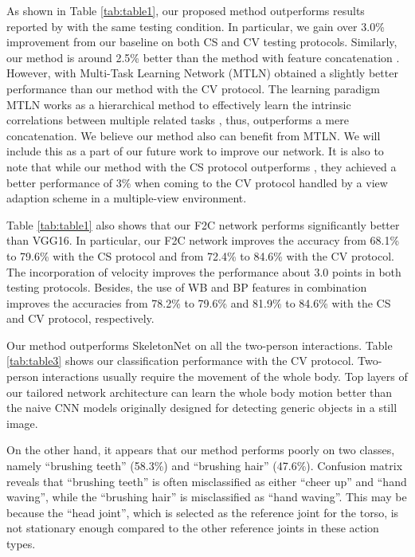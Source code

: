 \documentclass{bmvc2k}
\begin{document}
As shown in Table \ref{tab:table1}, our proposed method outperforms results reported by \cite{vemulapalli2014human, shahroudy2016ntu,liu2016spatio,hutemporal,liu2018skeleton,liu2017enhanced,ke2017skeletonnet} with the same testing condition. In particular, we gain over 3.0\% improvement from our baseline \cite{ke2017skeletonnet} on both CS and CV testing protocols. Similarly, our method is around 2.5\% better than the method with feature concatenation \cite{ke2017new}. However, \cite{ke2017new} with Multi-Task Learning Network (MTLN) obtained a slightly better performance than our method with the CV protocol. The learning paradigm MTLN works as a hierarchical method to effectively learn the intrinsic correlations between multiple related tasks \cite{zhang2014regularization}, thus, outperforms a mere concatenation. We believe our method also can benefit from MTLN. We will include this as a part of our future work to improve our network. It is also to note that while our method with the CS protocol outperforms \cite{zhang2017view}, they achieved a better performance of 3\% when coming to the CV protocol handled by a view adaption scheme in a multiple-view environment.

Table \ref{tab:table1} also shows that our F2C network performs significantly better than VGG16. In particular, our F2C network improves the accuracy from 68.1\% to 79.6\% with the CS protocol and from 72.4\% to 84.6\% with the CV protocol. The incorporation of velocity improves the performance about 3.0 points in both testing protocols. Besides, the use of WB and BP features in combination improves the accuracies from 78.2\% to 79.6\% and 81.9\% to 84.6\% with the CS and CV protocol, respectively.

Our method outperforms SkeletonNet on all the two-person interactions. Table \ref{tab:table3} shows our classification performance with the CV protocol. Two-person interactions usually require the movement of the whole body. Top layers of our tailored network architecture can learn the whole body motion better than the naive CNN models originally designed for detecting generic objects in a still image. 

On the other hand, it appears that our method performs poorly on two classes, namely ``brushing teeth'' (58.3\%) and ``brushing hair'' (47.6\%). Confusion matrix reveals that ``brushing teeth'' is often misclassified as either ``cheer up'' and ``hand waving'', while the ``brushing hair'' is misclassified as ``hand waving''. This may be because the ``head joint'', which is selected as the reference joint for the torso, is not stationary enough compared to the other reference joints in these action types. 
\end{document}
